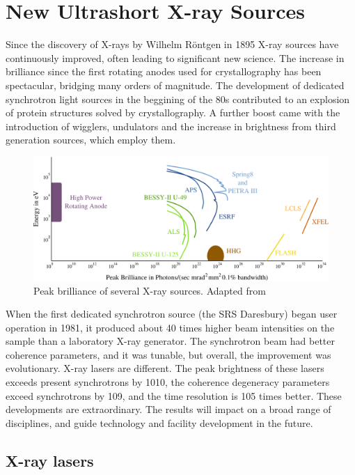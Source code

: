 \chapter{New Ultrashort X-ray Sources}\label{Ultrashort X-ray Sources}\noindent
 
Since the discovery of X-rays by Wilhelm R\"{o}ntgen in 1895 X-ray sources have
continuously improved, often leading to significant new science. The increase in
brilliance since the first rotating anodes used for crystallography has been
spectacular, bridging many orders of magnitude. The development of dedicated
synchrotron light sources in the beggining of the 80s contributed to an explosion of
protein structures solved by crystallography. A further boost came with
the introduction of wigglers, undulators and the increase in brightness from
third generation sources, which employ them.

 
\begin{figure}[h]
\centering
  \includegraphics[width=1.0 \columnwidth]{brilliance.png}
  \caption{Peak brilliance of several X-ray sources. 
    Adapted from \cite{Ackermann2007Operation,Materlik2001TESLA}}
  \label{Fig:Brilliance}
\end{figure}

When the first dedicated synchrotron source (the SRS Daresbury) began user
operation in 1981, it produced about 40 times higher beam intensities on the
sample than a laboratory X-ray generator. The synchrotron beam had better
coherence parameters, and it was tunable, but overall, the improvement was
evolutionary. X-ray lasers are different. The peak brightness of these lasers
exceeds present synchrotrons by 1010, the coherence degeneracy parameters exceed
synchrotrons by 109, and the time resolution is 105 times better. These
developments are extraordinary. The results will impact on a broad range of
disciplines, and guide technology and facility development in the future. 
 
\section{X-ray lasers}
 
